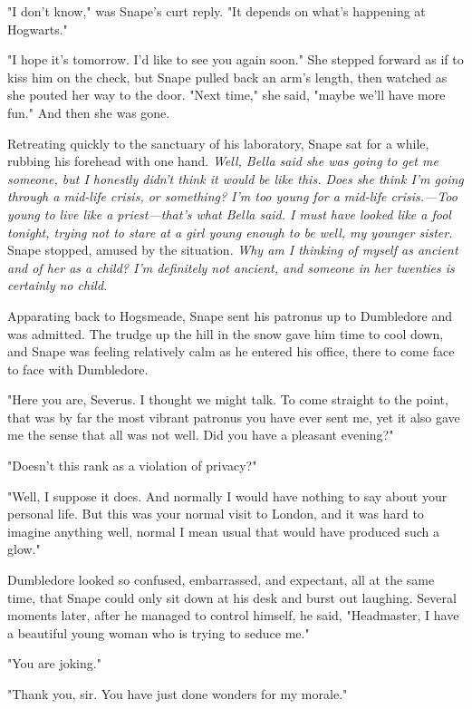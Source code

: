"I don't know," was Snape's curt reply. "It depends on what's happening at Hogwarts."

"I hope it's tomorrow. I'd like to see you again soon." She stepped forward as if to kiss him on the check, but Snape pulled back an arm's length, then watched as she pouted her way to the door. "Next time," she said, "maybe we'll have more fun." And then she was gone.

Retreating quickly to the sanctuary of his laboratory, Snape sat for a while, rubbing his forehead with one hand. \emph{Well, Bella said she was going to get me someone, but I honestly didn't think it would be like this. Does she think I'm going through a mid-life crisis, or something? I'm too young for a mid-life crisis.—Too young to live like a priest—that's what Bella said. I must have looked like a fool tonight, trying not to stare at a girl young enough to be{\el} well, my younger sister.} Snape stopped, amused by the situation. \emph{Why am I thinking of myself as ancient and of her as a child? I'm definitely not ancient, and someone in her twenties is certainly no child.}

Apparating back to Hogsmeade, Snape sent his patronus up to Dumbledore and was admitted. The trudge up the hill in the snow gave him time to cool down, and Snape was feeling relatively calm as he entered his office, there to come face to face with Dumbledore.

"Here you are, Severus. I thought we might talk. To come straight to the point, that was by far the most vibrant patronus you have ever sent me, yet it also gave me the sense that all was not well. Did you have a{\el} pleasant evening?"

"Doesn't this rank as a violation of privacy?"

"Well, I suppose it does. And normally I would have nothing to say about your personal life. But this was your normal visit to{\el} London, and it was hard to imagine anything{\el} well, normal{\el} I mean usual{\el} that would have produced such a{\el} glow."

Dumbledore looked so confused, embarrassed, and expectant, all at the same time, that Snape could only sit down at his desk and burst out laughing. Several moments later, after he managed to control himself, he said, "Headmaster, I have a beautiful young woman who is trying to seduce me."

"You are joking."

"Thank you, sir. You have just done wonders for my morale."

